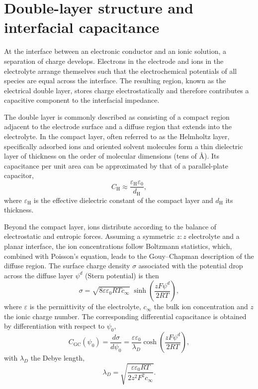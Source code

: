 \section{Double-layer structure and interfacial capacitance}

At the interface between an electronic conductor and an ionic solution, a separation of charge develops. 
Electrons in the electrode and ions in the electrolyte arrange themselves such that the electrochemical potentials of all species are equal across the interface. 
The resulting region, known as the electrical double layer, stores charge electrostatically and therefore contributes a capacitive component to the interfacial impedance.

The double layer is commonly described as consisting of a compact region adjacent to the electrode surface and a diffuse region that extends into the electrolyte. 
In the compact layer, often referred to as the Helmholtz layer, specifically adsorbed ions and oriented solvent molecules form a thin dielectric layer of thickness on the order of molecular dimensions (tens of Å). 
Its capacitance per unit area can be approximated by that of a parallel-plate capacitor,
\begin{equation}
    C_{\mathrm{H}} \approx \frac{\varepsilon_{\mathrm{H}} \varepsilon_0}{d_{\mathrm{H}}},
\end{equation}
where $\varepsilon_{\mathrm{H}}$ is the effective dielectric constant of the compact layer and $d_{\mathrm{H}}$ its thickness.

Beyond the compact layer, ions distribute according to the balance of electrostatic and entropic forces.
Assuming a symmetric $z:z$ electrolyte and a planar interface, the ion concentrations follow Boltzmann statistics, which, combined with Poisson's equation, leads to the Gouy--Chapman description of the diffuse region.
The surface charge density $\sigma$ associated with the potential drop across the diffuse layer $\psi^d$ (Stern potential) is then
\begin{equation}
    \sigma = \sqrt{8 \varepsilon \varepsilon_0 R T c_\infty} \;
    \sinh\!\left( \frac{z F \psi^d}{2 R T} \right),
\end{equation}
where $\varepsilon$ is the permittivity of the electrolyte, $c_\infty$ the bulk ion concentration and $z$ the ionic charge number. 
The corresponding differential capacitance is obtained by differentiation with respect to $\psi_0$,
\begin{equation}
    C_{\mathrm{GC}}(\psi_0) = \frac{d\sigma}{d\psi_0}
    = \frac{\varepsilon \varepsilon_0}{\lambda_D}
      \cosh\!\left( \frac{z F \psi^d}{2 R T} \right),
\end{equation}
with $\lambda_D$ the Debye length,
\begin{equation}
    \lambda_D = \sqrt{\frac{\varepsilon \varepsilon_0 R T}{2 z^2 F^2 c_\infty}}.
\end{equation}


